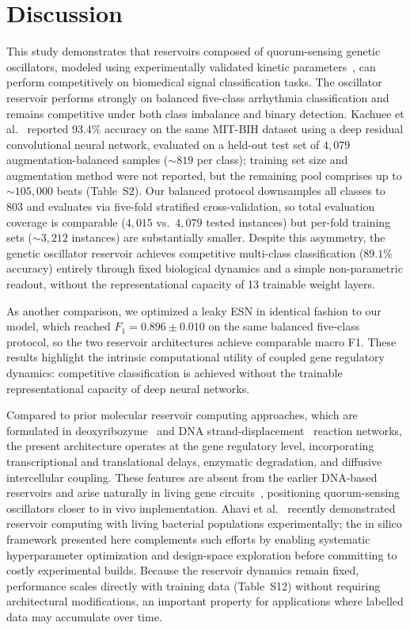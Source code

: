 \documentclass[journal=asbcd6,manuscript=article,keywords]{achemso}
\begin{document}
\section{Discussion}
This study demonstrates that reservoirs composed of quorum-sensing genetic oscillators, modeled using experimentally validated kinetic parameters~\cite{Danino2010}, can perform competitively on biomedical signal classification tasks. 
The oscillator reservoir performs strongly on balanced five-class arrhythmia classification and remains competitive under both class imbalance and binary detection.
Kachuee et al.~\cite{Kachuee2018} reported 93.4\% accuracy on the same MIT-BIH dataset using a deep residual convolutional neural network, evaluated on a held-out test set of $4{,}079$ augmentation-balanced samples (${\sim}819$ per class); training set size and augmentation method were not reported, but the remaining pool comprises up to ${\sim}105{,}000$ beats (Table~S2).
Our balanced protocol downsamples all classes to 803 and evaluates via five-fold stratified cross-validation, so total evaluation coverage is comparable ($4{,}015$ vs.\ $4{,}079$ tested instances) but per-fold training sets (${\sim}3{,}212$ instances) are substantially smaller.
Despite this asymmetry, the genetic oscillator reservoir achieves competitive multi-class classification ($89.1\%$ accuracy) entirely through fixed biological dynamics and a simple non-parametric readout, without the representational capacity of 13 trainable weight layers.

As another comparison, we optimized a leaky ESN in identical fashion to our model, which reached $F_1 = 0.896 \pm 0.010$ on the same balanced five-class protocol, so the two reservoir architectures achieve comparable macro F1.
These results highlight the intrinsic computational utility of coupled gene regulatory dynamics: competitive classification is achieved without the trainable representational capacity of deep neural networks.

Compared to prior molecular reservoir computing approaches, which are formulated in deoxyribozyme~\cite{Goudarzi2013} and DNA strand-displacement~\cite{Liu2022} reaction networks, the present architecture operates at the gene regulatory level, incorporating transcriptional and translational delays, enzymatic degradation, and diffusive intercellular coupling. 
These features are absent from the earlier DNA-based reservoirs and arise naturally in living gene circuits~\cite{Danino2010}, positioning quorum-sensing oscillators closer to in vivo implementation. 
Ahavi et al.~\cite{Ahavi2024} recently demonstrated reservoir computing with living bacterial populations experimentally; the in silico framework presented here complements such efforts by enabling systematic hyperparameter optimization and design-space exploration before committing to costly experimental builds.
Because the reservoir dynamics remain fixed, performance scales directly with training data (Table~S12) without requiring architectural modifications, an important property for applications where labelled data may accumulate over time.
\end{document}

